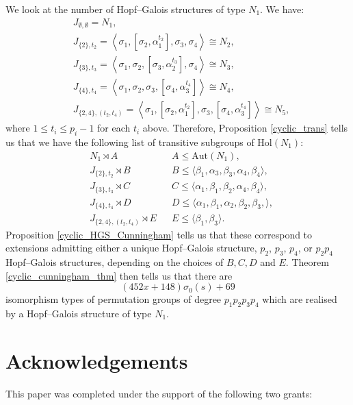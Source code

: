 \documentclass[a4paper,reqno]{amsart}
\theoremstyle{definition}
\newcommand{\Aut}{\mathrm{Aut}}
\newcommand{\Hol}{\mathrm{Hol}}
\begin{document}
We look at the number of Hopf--Galois structures of type $N_1$. We have:
\begin{align*}
    &J_{\emptyset,\emptyset}=N_1,\\
    &J_{\{2\},t_2}=\left\langle \sigma_1, \left[\sigma_2,\alpha_1^{t_2}\right], \sigma_3,\sigma_4\right\rangle \cong N_2,\\
    &J_{\{3\},t_3}=\left\langle \sigma_1, \sigma_2, \left[\sigma_3,\alpha_2^{t_3}\right], \sigma_4 \right\rangle \cong N_3,\\
    &J_{\{4\},t_4}=\left\langle \sigma_1, \sigma_2, \sigma_3, \left[\sigma_4,\alpha_3^{t_4}\right] \right\rangle \cong N_4,\\
    &J_{\{2,4\},(t_2,t_4)}=\left\langle \sigma_1, \left[\sigma_2,\alpha_1^{t_2}\right], \sigma_3, \left[\sigma_4,\alpha_3^{t_4}\right] \right\rangle \cong N_5,
\end{align*}
where $1 \leq t_i \leq p_i-1$ for each $t_i$ above. Therefore, Proposition \ref{cyclic_trans} tells us that we have the following list of transitive subgroups of $\Hol(N_1)$:
\begin{align*}
    &N_1 \rtimes A               && A \leq \Aut(N_1),\\
    &J_{\{2\},t_2} \rtimes B   && B \leq \langle \beta_1,\alpha_3,\beta_3, \alpha_4,\beta_4 \rangle,\\
    &J_{\{3\},t_3} \rtimes C   && C \leq \langle \alpha_1,\beta_1,\beta_2, \alpha_4,\beta_4 \rangle,\\
    &J_{\{4\},t_4} \rtimes D   && D \leq \langle \alpha_1,\beta_1, \alpha_2, \beta_2, \beta_3, \rangle,\\
    &J_{\{2,4\},(t_2,t_4)} \rtimes E && E \leq \langle \beta_1,\beta_3 \rangle.
\end{align*}
Proposition \ref{cyclic_HGS_Cunningham} tells us that these correspond to extensions admitting either a unique Hopf--Galois structure, $p_2$, $p_3$, $p_4$, or $p_2p_4$ Hopf--Galois structures, depending on the choices of $B,C,D$ and $E$. Theorem \ref{cyclic_cunningham_thm} then tells us that there are
\[(452x+148)\sigma_0(s)+69\]
isomorphism types of permutation groups of degree $p_1p_2p_3p_4$ which are realised by a Hopf--Galois structure of type $N_1$. 

\section*{Acknowledgements}
This paper was completed under the support of the following two grants:
\end{document}

